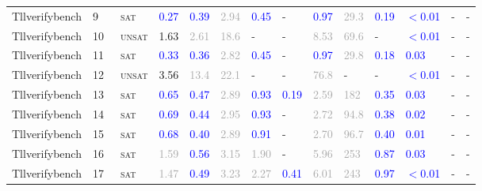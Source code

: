 \begin{center}
{\begin{longtable}{@{}llllllllllllll@{}}
Tllverifybench & 9 & ~\textsc{sat} & \textcolor{blue}{0.27} & \textcolor{blue}{0.39} & \textcolor{darkgray}{2.94} & \textcolor{blue}{0.45} & - & \textcolor{blue}{0.97} & \textcolor{darkgray}{29.3} & \textcolor{blue}{0.19} & \textcolor{blue}{$<$0.01} & - & - \\
Tllverifybench & 10 & ~\textsc{unsat} & \textcolor{second}{1.63} & \textcolor{darkgray}{2.61} & \textcolor{darkgray}{18.6} & - & - & \textcolor{darkgray}{8.53} & \textcolor{darkgray}{69.6} & - & \textcolor{blue}{$<$0.01} & - & - \\
Tllverifybench & 11 & ~\textsc{sat} & \textcolor{blue}{0.33} & \textcolor{blue}{0.36} & \textcolor{darkgray}{2.82} & \textcolor{blue}{0.45} & - & \textcolor{blue}{0.97} & \textcolor{darkgray}{29.8} & \textcolor{blue}{0.18} & \textcolor{blue}{0.03} & - & - \\
Tllverifybench & 12 & ~\textsc{unsat} & \textcolor{second}{3.56} & \textcolor{darkgray}{13.4} & \textcolor{darkgray}{22.1} & - & - & \textcolor{darkgray}{76.8} & - & - & \textcolor{blue}{$<$0.01} & - & - \\
Tllverifybench & 13 & ~\textsc{sat} & \textcolor{blue}{0.65} & \textcolor{blue}{0.47} & \textcolor{darkgray}{2.89} & \textcolor{blue}{0.93} & \textcolor{blue}{0.19} & \textcolor{darkgray}{2.59} & \textcolor{darkgray}{182} & \textcolor{blue}{0.35} & \textcolor{blue}{0.03} & - & - \\
Tllverifybench & 14 & ~\textsc{sat} & \textcolor{blue}{0.69} & \textcolor{blue}{0.44} & \textcolor{darkgray}{2.95} & \textcolor{blue}{0.93} & - & \textcolor{darkgray}{2.72} & \textcolor{darkgray}{94.8} & \textcolor{blue}{0.38} & \textcolor{blue}{0.02} & - & - \\
Tllverifybench & 15 & ~\textsc{sat} & \textcolor{blue}{0.68} & \textcolor{blue}{0.40} & \textcolor{darkgray}{2.89} & \textcolor{blue}{0.91} & - & \textcolor{darkgray}{2.70} & \textcolor{darkgray}{96.7} & \textcolor{blue}{0.40} & \textcolor{blue}{0.01} & - & - \\
Tllverifybench & 16 & ~\textsc{sat} & \textcolor{darkgray}{1.59} & \textcolor{blue}{0.56} & \textcolor{darkgray}{3.15} & \textcolor{darkgray}{1.90} & - & \textcolor{darkgray}{5.96} & \textcolor{darkgray}{253} & \textcolor{blue}{0.87} & \textcolor{blue}{0.03} & - & - \\
Tllverifybench & 17 & ~\textsc{sat} & \textcolor{darkgray}{1.47} & \textcolor{blue}{0.49} & \textcolor{darkgray}{3.23} & \textcolor{darkgray}{2.27} & \textcolor{blue}{0.41} & \textcolor{darkgray}{6.01} & \textcolor{darkgray}{243} & \textcolor{blue}{0.97} & \textcolor{blue}{$<$0.01} & - & - \\

\end{longtable}}
\end{center}

